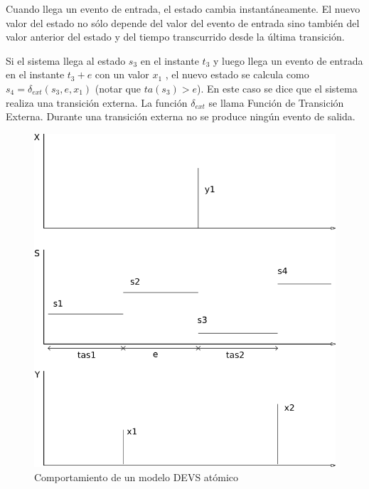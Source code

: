 	Cuando llega un evento de entrada, el estado cambia instantáneamente. El nuevo valor del estado no sólo depende del valor del evento de entrada sino 
	también del valor anterior del estado y del tiempo transcurrido desde la última transición.

	Si el sistema llega al estado $s_3$ en el instante $t_3$ y luego llega un evento de entrada en el instante $t_3 + e$ con un valor $x_1$ , el nuevo estado 
	se calcula como $s_4 = \delta_{ext} (s_3 , e, x_1 )$ (notar que $ta(s_3 ) > e$). En este caso se dice que el sistema realiza una transición externa. 
	La función $\delta_{ext}$ se llama Función de Transición Externa. Durante una transición externa no se produce ningún evento de salida.

	\begin{figure}[!htbp]
	  \includegraphics[scale=0.5]{devs-atomic}
	  \caption{Comportamiento de un modelo DEVS atómico}
	   \label{fig:fig2-5}
	\end{figure}

